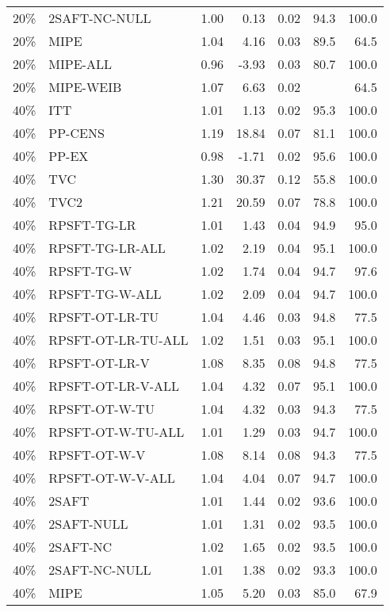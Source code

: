 \begin{table}[ht]
{\begin{tabular}{llrrrrr}
  20\% & 2SAFT-NC-NULL & 1.00 & 0.13 & 0.02 & 94.3 & 100.0 \\ 
  20\% & MIPE & 1.04 & 4.16 & 0.03 & 89.5 & 64.5 \\ 
  20\% & MIPE-ALL & 0.96 & -3.93 & 0.03 & 80.7 & 100.0 \\ 
  20\% & MIPE-WEIB & 1.07 & 6.63 & 0.02 &  & 64.5 \\ 
   \hline
40\% & ITT & 1.01 & 1.13 & 0.02 & 95.3 & 100.0 \\ 
  40\% & PP-CENS & 1.19 & 18.84 & 0.07 & 81.1 & 100.0 \\ 
  40\% & PP-EX & 0.98 & -1.71 & 0.02 & 95.6 & 100.0 \\ 
  40\% & TVC & 1.30 & 30.37 & 0.12 & 55.8 & 100.0 \\ 
  40\% & TVC2 & 1.21 & 20.59 & 0.07 & 78.8 & 100.0 \\ 
   \hline
40\% & RPSFT-TG-LR & 1.01 & 1.43 & 0.04 & 94.9 & 95.0 \\ 
  40\% & RPSFT-TG-LR-ALL & 1.02 & 2.19 & 0.04 & 95.1 & 100.0 \\ 
  40\% & RPSFT-TG-W & 1.02 & 1.74 & 0.04 & 94.7 & 97.6 \\ 
  40\% & RPSFT-TG-W-ALL & 1.02 & 2.09 & 0.04 & 94.7 & 100.0 \\ 
  40\% & RPSFT-OT-LR-TU & 1.04 & 4.46 & 0.03 & 94.8 & 77.5 \\ 
  40\% & RPSFT-OT-LR-TU-ALL & 1.02 & 1.51 & 0.03 & 95.1 & 100.0 \\ 
  40\% & RPSFT-OT-LR-V & 1.08 & 8.35 & 0.08 & 94.8 & 77.5 \\ 
  40\% & RPSFT-OT-LR-V-ALL & 1.04 & 4.32 & 0.07 & 95.1 & 100.0 \\ 
   \hline
40\% & RPSFT-OT-W-TU & 1.04 & 4.32 & 0.03 & 94.3 & 77.5 \\ 
  40\% & RPSFT-OT-W-TU-ALL & 1.01 & 1.29 & 0.03 & 94.7 & 100.0 \\ 
  40\% & RPSFT-OT-W-V & 1.08 & 8.14 & 0.08 & 94.3 & 77.5 \\ 
  40\% & RPSFT-OT-W-V-ALL & 1.04 & 4.04 & 0.07 & 94.7 & 100.0 \\ 
   \hline
40\% & 2SAFT & 1.01 & 1.44 & 0.02 & 93.6 & 100.0 \\ 
  40\% & 2SAFT-NULL & 1.01 & 1.31 & 0.02 & 93.5 & 100.0 \\ 
  40\% & 2SAFT-NC & 1.02 & 1.65 & 0.02 & 93.5 & 100.0 \\ 
  40\% & 2SAFT-NC-NULL & 1.01 & 1.38 & 0.02 & 93.3 & 100.0 \\ 
  40\% & MIPE & 1.05 & 5.20 & 0.03 & 85.0 & 67.9 \\ 

\end{tabular}}
\end{table}
